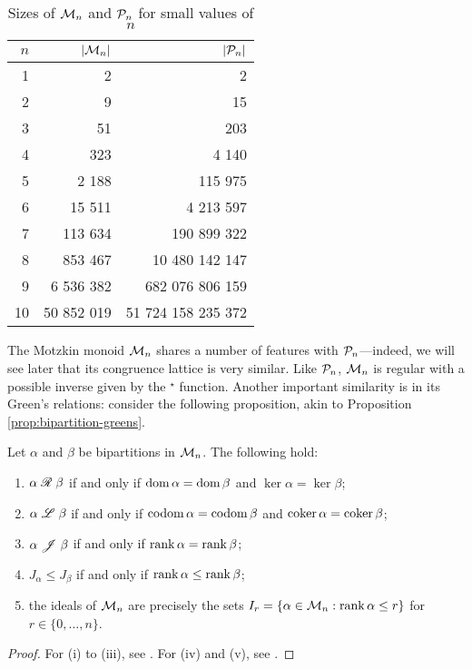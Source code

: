 \begin{table}[h]
  \centering
  \renewcommand\arraystretch{1.0}
  \begin{tabular}{| r | r | r |}
    \hline
    $n$ & $|\mathcal{M}_n|$ & $|\mathcal{P}_n|$ \\
    \hline
     1 &           2 &                  2 \\
     2 &           9 &                 15 \\
     3 &          51 &                203 \\
     4 &         323 &              4 140 \\
     5 &       2 188 &            115 975 \\
     6 &      15 511 &          4 213 597 \\
     7 &     113 634 &        190 899 322 \\
     8 &     853 467 &     10 480 142 147 \\
     9 &   6 536 382 &    682 076 806 159 \\
    10 &  50 852 019 & 51 724 158 235 372 \\
    \hline
  \end{tabular}
  \renewcommand\arraystretch{0.7}
  \caption{Sizes of $\mathcal{M}_n$ and $\mathcal{P}_n$ for small values of $n$}
  \label{tab:mn-size}
\end{table}

The Motzkin monoid $\mathcal{M}_n$ shares a number of features with $\mathcal{P}_n$---indeed,
we will see later that its congruence lattice is very similar.  Like $\mathcal{P}_n$,
$\mathcal{M}_n$ is regular with a possible inverse given by the $^\star$
function. Another important similarity is in its Green's relations: consider the
following proposition, akin to Proposition \ref{prop:bipartition-greens}.

\begin{proposition}
  \label{prop:mn-greens}
  Let $\alpha$ and $\beta$ be bipartitions in $\mathcal{M}_n$.  The following hold:
  \begin{enumerate}[\rm(i)]
  \item $\alpha \mathrel{\mathscr{R}} \beta$ if and only if $\operatorname{dom} \alpha = \operatorname{dom} \beta$ and
    $\ker \alpha = \ker \beta$;
  \item $\alpha \mathrel{\mathscr{L}} \beta$ if and only if $\operatorname{codom} \alpha = \operatorname{codom} \beta$ and
    $\operatorname{coker} \alpha = \operatorname{coker} \beta$;
  \item $\alpha \mathrel{\mathscr{J}} \beta$ if and only if $\operatorname{rank} \alpha = \operatorname{rank} \beta$;
  \item $J_\alpha \leq J_\beta$ if and only if $\operatorname{rank} \alpha \leq \operatorname{rank} \beta$;
  \item the ideals of $\mathcal{M}_n$ are precisely the sets
    $I_r=\{\alpha \in \mathcal{M}_n : \operatorname{rank} \alpha \leq r\}$ for
    $r \in \{0, \ldots, n\}$.
  \end{enumerate}
  \begin{proof}
    For (i) to (iii), see \cite[Theorem 2.4]{deg_motzkin}.  For (iv) and (v),
    see \cite[Proposition 2.6]{deg_motzkin}.
  \end{proof}
\end{proposition}

